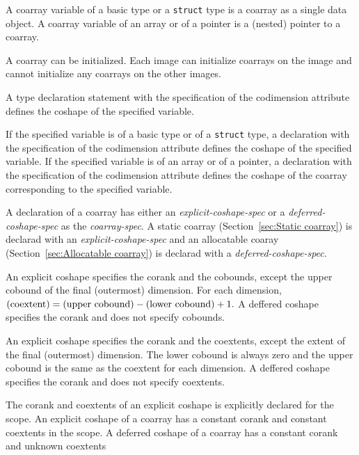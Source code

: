 {\onlyC} 
A coarray variable of a basic type or a {\tt struct} type is a coarray 
as a single data object.
A coarray variable of an array or of a pointer is a (nested) pointer 
to a coarray.

A coarray can be initialized. 
Each image can initialize coarrays on the image and cannot initialize
any coarrays on the other images.


{\onlyF} A type declaration statement 
with the specification of the codimension attribute
defines the coshape of the specified variable.

{\onlyC} If the specified variable is of a basic type or of a {\tt struct} type,
a declaration with the specification of the codimension attribute
defines the coshape of the specified variable.
If the specified variable is of an array or of a pointer,
a declaration with the specification of the codimension attribute
defines the coshape of the coarray corresponding to the specified variable.


A declaration of a coarray has either an {\it explicit-coshape-spec} 
or a {\it deferred-coshape-spec} as the {\it coarray-spec}.
A static coarray (Section~\ref{sec:Static coarray}) is declarad 
with an {\it explicit-coshape-spec} and
an allocatable coaray (Section~\ref{sec:Allocatable coarray}) is declarad 
with a {\it deferred-coshape-spec}.



{\onlyF} 
An explicit coshape specifies the corank and the cobounds, 
except the upper cobound of the final (outermost) dimension.
For each dimension, 
\(($coextent$) = ($upper cobound$) - ($lower cobound$) + 1.\)
A deffered coshape specifies the corank and does not specify cobounds.

{\onlyC}
An explicit coshape specifies the corank and the coextents,
except the extent of the final (outermost) dimension.
The lower cobound is always zero and the upper cobound is the same as 
the coextent for each dimension.
A deffered coshape specifies the corank and does not specify coextents.


The corank and coextents of an explicit coshape is explicitly declared
for the scope.
An explicit coshape of a coarray has a constant corank and 
constant coextents in the scope.
A deferred coshape of a coarray has a constant corank and
unknown coextents 


